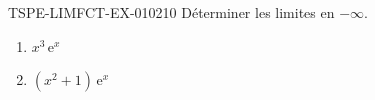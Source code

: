 \begin{exercice}{TSPE-LIMFCT-EX-010}{2}{10}
Déterminer les limites en $-\infty$.
\begin{enumerate}
  \item $x^3\,\mathrm{e}^x$
  \item $(x^2 + 1)\,\mathrm{e}^x$
\end{enumerate}
\end{exercice}
